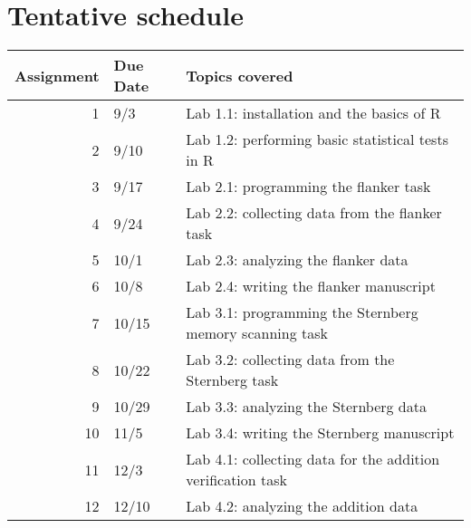 \documentclass[10pt]{article}
\begin{document}
\section*{Tentative schedule}
\label{sec:orgf2bab2f}

\begin{center}
\begin{tabular}{rll}
Assignment & Due Date & Topics covered\\
\hline
1 & 9/3 & Lab 1.1: installation and the basics of R\\
2 & 9/10 & Lab 1.2: performing basic statistical tests in R\\
3 & 9/17 & Lab 2.1: programming the flanker task\\
4 & 9/24 & Lab 2.2: collecting data from the flanker task\\
5 & 10/1 & Lab 2.3: analyzing the flanker data\\
6 & 10/8 & Lab 2.4: writing the flanker manuscript\\
7 & 10/15 & Lab 3.1: programming the Sternberg memory scanning task\\
8 & 10/22 & Lab 3.2: collecting data from the Sternberg task\\
9 & 10/29 & Lab 3.3: analyzing the Sternberg data\\
10 & 11/5 & Lab 3.4: writing the Sternberg manuscript\\
11 & 12/3 & Lab 4.1: collecting data for the addition verification task\\
12 & 12/10 & Lab 4.2: analyzing the addition data\\
\end{tabular}
\end{center}
\end{document}

